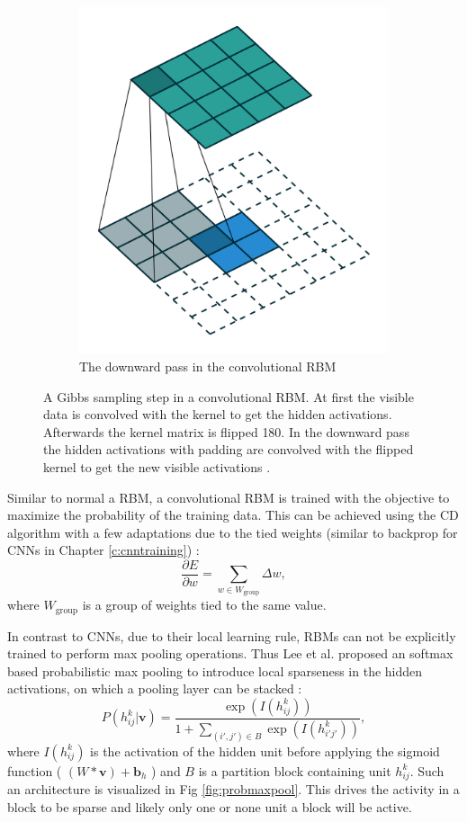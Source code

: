 \begin{figure}
\begin{subfigure}[t]{.30\textwidth}
  		\includegraphics[width=.8\linewidth]{imgs/crbm_padding2.png}
  		\caption{The downward pass in the convolutional RBM}
  		\label{fig:convrbmsub3}
	\end{subfigure}
	\caption[A Gibbs sampling step in a convolutional RBM.]{A Gibbs sampling step in a convolutional RBM. At first the visible data is convolved with the kernel to get the hidden activations. Afterwards the kernel matrix is flipped 180\textdegree . In the downward pass the hidden activations with padding are convolved with the flipped kernel to get the new visible activations \cite{convImg}.}
	\label{fig:convrbm}
\end{figure}


Similar to normal a RBM, a convolutional RBM is trained with the objective to maximize the probability of the training data.
This can be achieved using the CD algorithm with a few adaptations due to the tied weights (similar to backprop for CNNs in Chapter \ref{c:cnntraining}) \cite{NorouziM2009}: 
\[
\frac{\partial E}{\partial w} = \sum_{w \in W_{\text{group}}} \Delta w,
\]
where $W_{\text{group}}$ is a group of weights tied to the same value.

In contrast to CNNs, due to their local learning rule, RBMs can not be explicitly trained to perform max pooling operations.
Thus Lee et al. proposed an softmax based probabilistic max pooling to introduce local sparseness in the hidden activations, on which a pooling layer can be stacked \cite{lee2009convolutional}:
\[
P(h^k_{ij} | \textbf{v}) = \frac{\exp(I(h^k_{ij}))}{1 + \sum_{(i',j') \in B} \exp(I(h^k_{i'j'}))},
\]
where $I(h^k_{ij})$ is the activation of the hidden unit before applying the sigmoid function ( $(W * \textbf{v}) + \textbf{b}_{h}$ ) and $B$ is a partition block containing unit $h^k_{ij}$. 
Such an architecture is visualized in Fig \ref{fig:probmaxpool}.
This drives the activity in a block to be sparse and likely only one or none unit a block will be active.

